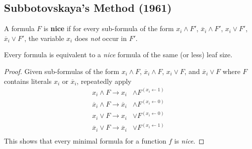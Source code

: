 \subsection{Subbotovskaya's Method (1961)} 
\begin{definition}
	A formula $F$ is \textbf{nice} if for every sub-formula of the form $x_i \land F'$, $\overline{x}_i \land F'$, $x_i \lor F'$, $\overline{x}_i \lor F'$, the variable $x_i$ does \emph{not} occur in $F'$.
\end{definition}

\begin{lemma}
	Every formula is equivalent to a \emph{nice} formula of the same (or less) leaf size.
\end{lemma}
\begin{proof}
	Given sub-formulas of the form $x_i \land F$, $\overline{x}_i \land F$, $x_i \lor F$, and $\overline{x}_i \lor F$ where $F$ contains literals $x_i$ or $\overline{x}_i$, repeatedly apply 
	\begin{align*}
		x_i \land F \rightarrow x_i &\land F^{(x_i \leftarrow 1)}\\
		\overline{x}_i \land F \rightarrow \overline{x}_i &\land F^{(x_i \leftarrow 0)}\\
		x_i \lor F \rightarrow x_i &\lor F^{(x_i \leftarrow 0)}\\
		\overline{x}_i \lor F \rightarrow \overline{x}_i &\lor F^{(x_i \leftarrow 1)}\\
	\end{align*}
	This shows that every minimal formula for a function $f$ is \emph{nice}.
\end{proof}

